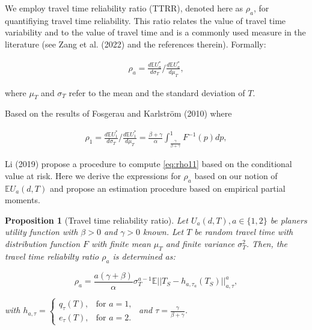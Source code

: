 \documentclass[
]{article}
\newtheorem{proposition}{Proposition}[section]
\theoremstyle{definition}
\theoremstyle{definition}
\theoremstyle{definition}
\theoremstyle{definition}
\theoremstyle{remark}
\begin{document}
We employ travel time reliability ratio (TTRR), denoted here as \(\rho_a\), for quantifiying travel time reliability. This ratio relates the value of travel time variability and to the value of travel time and is a commonly used measure in the literature (see Zang et al. (2022) and the references therein). Formally:

\begin{align}
\rho_a = \frac{d\mathbb EU_a^*}{d\sigma_T}/\frac{d\mathbb EU_a^*}{d\mu_T}, \label{eq:rho}
\end{align}

where \(\mu_T\) and \(\sigma_T\) refer to the mean and the standard deviation of \(T\).

Based on the results of Fosgerau and Karlström (2010) where

\begin{align}
\rho_1 = \frac{d\mathbb EU_1^*}{d\sigma_T}/\frac{d\mathbb EU_1^*}{d\mu_T} = \frac{\beta+\gamma}{\alpha}\int_{\frac{\gamma}{\beta+\gamma}}^1 F^{-1}(p)dp,
\label{eq:rho11}
\end{align}

Li (2019) propose a procedure to compute \eqref{eq:rho11} based on the conditional value at risk. Here we derive the expressions for \(\rho_a\) based on our notion of \(\mathbb EU_a(d,T)\) and propose an estimation procedure based on empirical partial moments.

\begin{proposition}[Travel time reliability ratio]
\protect\hypertarget{prp:proprho}{}\label{prp:proprho}Let \(U_a(d,T), a\in\{1,2\}\) be planers utility function with \(\beta>0\) and \(\gamma>0\) known. Let \(T\) be random travel time with distribution function \(F\) with finite mean \(\mu_T\) and finite variance \(\sigma_T^2\). Then, the travel time reliabilty ratio \(\rho_a\) is determined as:

\[\rho_a = \frac{a(\gamma+\beta)}{\alpha}\sigma_T^{a-1}\mathbb E||T_S-h_{a,\tau_a}(T_S)||_{a,\tau}^a,\]

with \(h_{a,\tau} = \begin{cases} q_\tau(T),&\text{for } a=1,\\ e_\tau(T),&\text{for }a=2.\end{cases}\) and \(\tau = \frac{\gamma}{\beta+\gamma}\).
\end{proposition}
\end{document}
